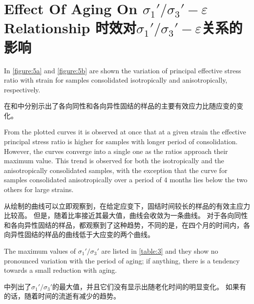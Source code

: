 \section{Effect Of Aging On $\sigma_1'/\sigma_3'-\varepsilon$ Relationship 时效对$\sigma_1'/\sigma_3'-\varepsilon$关系的影响}

\begin{paracol}{2}
    
    In \autoref{figure:5a} and \autoref{figure:5b} are shown the variation of principal effective stress ratio with strain for samples consolidated isotropically and anisotropically, respectively.

    \switchcolumn

    在和中分别示出了各向同性和各向异性固结的样品的主要有效应力比随应变的变化。

    \switchcolumn*

    From the plotted curves it is observed at once that at a given strain the effective principal stress ratio is higher for samples with longer period of consolidation. However, the curves converge into a single one as the ratios approach their maximum value. This trend is observed for both the isotropically and the anisotropically consolidated samples, with the exception that the curve for samples consolidated anisotropically over a period of 4 months lies below the two others for large strains.

    \switchcolumn
       
    从绘制的曲线可以立即观察到，在给定应变下，固结时间较长的样品的有效主应力比较高。 但是，随着比率接近其最大值，曲线会收敛为一条曲线。 对于各向同性和各向异性固结的样品，都观察到了这种趋势，不同的是，在四个月的时间内，各向异性固结的样品的曲线低于大应变的两个曲线。

    \switchcolumn*

    The maximum values of $\sigma_1'/\sigma_3'$ are listed in \autoref{table:3} and they show no pronounced variation with the period of aging; if anything, there is a tendency towards a small reduction with aging.

    \switchcolumn
       
    中列出了$\sigma_1'/\sigma_3'$的最大值，并且它们没有显示出随老化时间的明显变化。 如果有的话，随着时间的流逝有减少的趋势。

\end{paracol}

